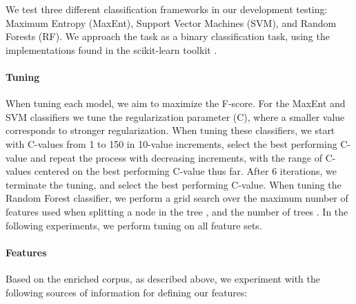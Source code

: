 \documentclass[11pt,letterpaper]{article}
\begin{document}
We test three different classification frameworks in our development testing: Maximum Entropy (MaxEnt), Support Vector Machines (SVM), and Random Forests (RF).  We approach the task as a binary classification task, using the implementations found in the scikit-learn toolkit \cite{scikit-learn}.

\paragraph{Tuning}
When tuning each model, we aim to maximize the F-score. For the MaxEnt and SVM classifiers we tune the regularization parameter (C), where a smaller value corresponds to stronger regularization. When tuning these classifiers, we start with C-values from 1 to 150 in 10-value increments, select the best performing C-value and repeat the process with decreasing increments, with the range of C-values centered on the best performing C-value thus far. After 6 iterations, we terminate the tuning, and select the best performing C-value. When tuning the Random Forest classifier, we perform a grid search over the maximum number of features used when splitting a node in the tree %
, and the number of trees %
. In the following experiments, we perform tuning on all feature sets.


\paragraph{Features}
Based on the enriched corpus, as described above, we experiment with the following sources of information for defining our features:
\end{document}
